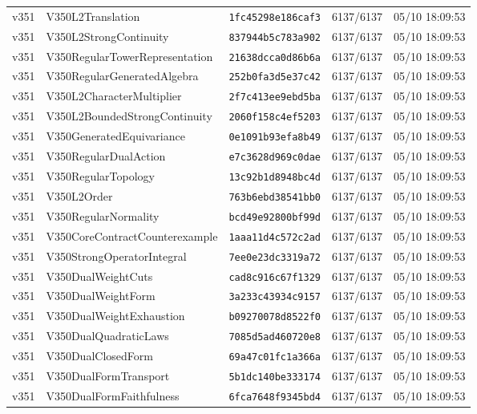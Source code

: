 \documentclass[11pt]{article}
\theoremstyle{definition}\newtheorem{deriv}{Derivation}
\begin{document}
{\begin{longtable}{@{}lllll@{}}
v351 & V350L2Translation & \texttt{1fc45298e186caf3} & 6137/6137 & 05/10 18:09:53 \\
v351 & V350L2StrongContinuity & \texttt{837944b5c783a902} & 6137/6137 & 05/10 18:09:53 \\
v351 & V350RegularTowerRepresentation & \texttt{21638dcca0d86b6a} & 6137/6137 & 05/10 18:09:53 \\
v351 & V350RegularGeneratedAlgebra & \texttt{252b0fa3d5e37c42} & 6137/6137 & 05/10 18:09:53 \\
v351 & V350L2CharacterMultiplier & \texttt{2f7c413ee9ebd5ba} & 6137/6137 & 05/10 18:09:53 \\
v351 & V350L2BoundedStrongContinuity & \texttt{2060f158c4ef5203} & 6137/6137 & 05/10 18:09:53 \\
v351 & V350GeneratedEquivariance & \texttt{0e1091b93efa8b49} & 6137/6137 & 05/10 18:09:53 \\
v351 & V350RegularDualAction & \texttt{e7c3628d969c0dae} & 6137/6137 & 05/10 18:09:53 \\
v351 & V350RegularTopology & \texttt{13c92b1d8948bc4d} & 6137/6137 & 05/10 18:09:53 \\
v351 & V350L2Order & \texttt{763b6ebd38541bb0} & 6137/6137 & 05/10 18:09:53 \\
v351 & V350RegularNormality & \texttt{bcd49e92800bf99d} & 6137/6137 & 05/10 18:09:53 \\
v351 & V350CoreContractCounterexample & \texttt{1aaa11d4c572c2ad} & 6137/6137 & 05/10 18:09:53 \\
v351 & V350StrongOperatorIntegral & \texttt{7ee0e23dc3319a72} & 6137/6137 & 05/10 18:09:53 \\
v351 & V350DualWeightCuts & \texttt{cad8c916c67f1329} & 6137/6137 & 05/10 18:09:53 \\
v351 & V350DualWeightForm & \texttt{3a233c43934c9157} & 6137/6137 & 05/10 18:09:53 \\
v351 & V350DualWeightExhaustion & \texttt{b09270078d8522f0} & 6137/6137 & 05/10 18:09:53 \\
v351 & V350DualQuadraticLaws & \texttt{7085d5ad460720e8} & 6137/6137 & 05/10 18:09:53 \\
v351 & V350DualClosedForm & \texttt{69a47c01fc1a366a} & 6137/6137 & 05/10 18:09:53 \\
v351 & V350DualFormTransport & \texttt{5b1dc140be333174} & 6137/6137 & 05/10 18:09:53 \\
v351 & V350DualFormFaithfulness & \texttt{6fca7648f9345bd4} & 6137/6137 & 05/10 18:09:53 \\

\end{longtable}}
\end{document}
